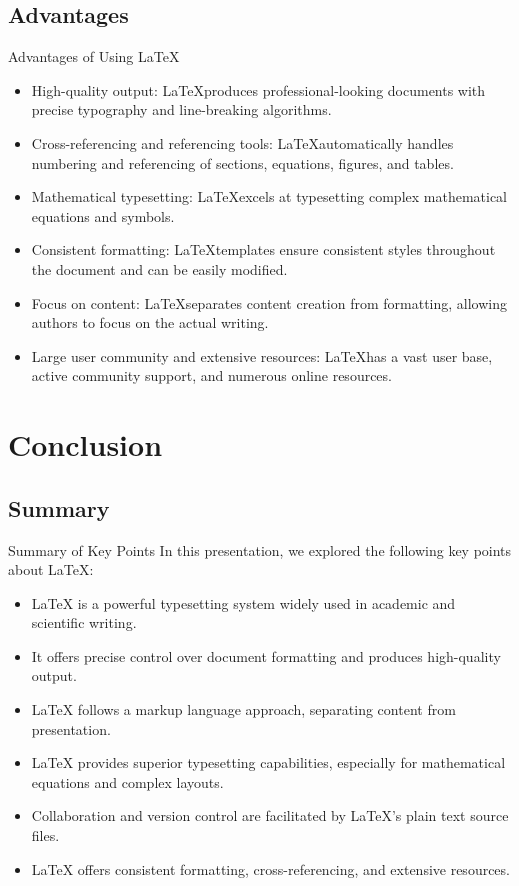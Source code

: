\documentclass{SUSTechBeamer}
\begin{document}
\subsection{Advantages}
\begin{frame}{Advantages of Using \LaTeX}
    \begin{itemize}
      \item High-quality output: \LaTeX produces professional-looking documents with precise typography and line-breaking algorithms.
      \item Cross-referencing and referencing tools: \LaTeX automatically handles numbering and referencing of sections, equations, figures, and tables.
      \item Mathematical typesetting: \LaTeX excels at typesetting complex mathematical equations and symbols.
      \item Consistent formatting: \LaTeX templates ensure consistent styles throughout the document and can be easily modified.
      \item Focus on content: \LaTeX separates content creation from formatting, allowing authors to focus on the actual writing.
      \item Large user community and extensive resources: \LaTeX has a vast user base, active community support, and numerous online resources.
    \end{itemize}
\end{frame}


\section{Conclusion}

\subsection{Summary}
\begin{frame}{Summary of Key Points}
In this presentation, we explored the following key points about LaTeX:

\begin{itemize}
    \item LaTeX is a powerful typesetting system widely used in academic and scientific writing.
    \item It offers precise control over document formatting and produces high-quality output.
    \item LaTeX follows a markup language approach, separating content from presentation.
    \item LaTeX provides superior typesetting capabilities, especially for mathematical equations and complex layouts.
    \item Collaboration and version control are facilitated by LaTeX's plain text source files.
    \item LaTeX offers consistent formatting, cross-referencing, and extensive resources.
\end{itemize}
\end{frame}
\end{document}
